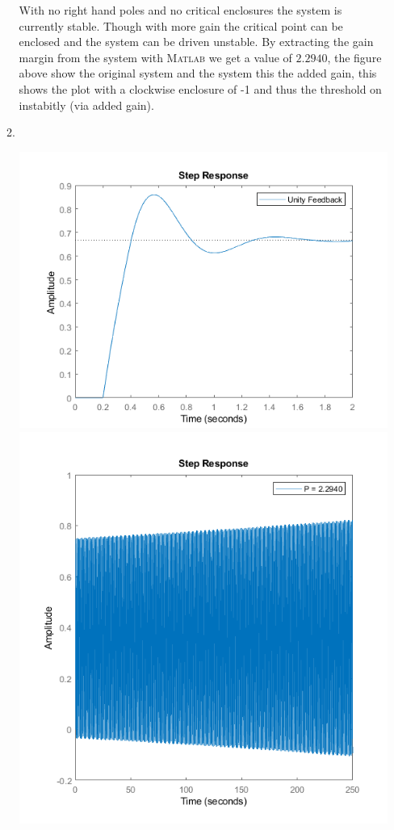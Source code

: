 \documentclass[11pt]{article}
\newcommand{\matlab}{\textsc{Matlab }} %
\begin{document}
\begin{preview}
\begin{enumerate}
\begin{enumerate}
\begin{center}
        \end{center}
        With no right hand poles and no critical enclosures the system is currently stable. Though with more gain the critical point can be enclosed and the system can be driven unstable. By extracting the gain margin from the system with \matlab we get a value of $2.2940$, the figure above show the original system and the system this the added gain, this shows the plot with a clockwise enclosure of -1 and thus the threshold on instabitly (via added gain).   
        \item $\;$
        \begin{center}
            \includegraphics[height=0.33\textwidth]{fig/2bs.png}
            \includegraphics[height=0.33\textwidth]{fig/2bu.png}


\end{center}
\end{enumerate}
\end{enumerate}
\end{preview}
\end{document}
